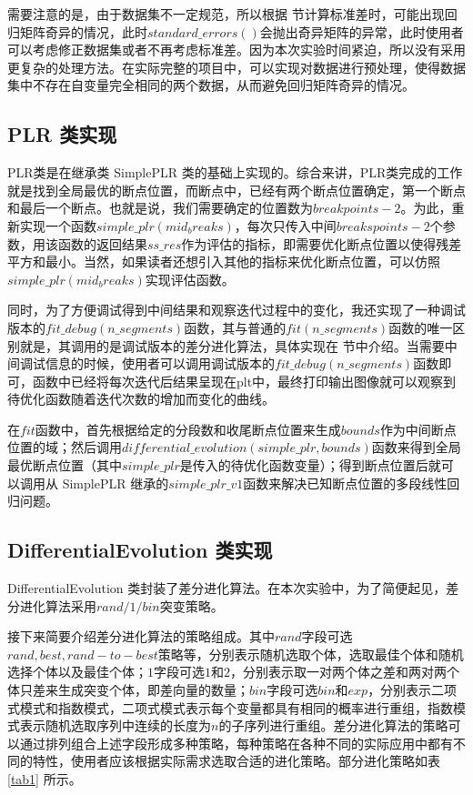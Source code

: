 需要注意的是，由于数据集不一定规范，所以根据  节计算标准差时，可能出现回归矩阵奇异的情况，此时$standard\_errors()$会抛出奇异矩阵的异常，此时使用者可以考虑修正数据集或者不再考虑标准差。因为本次实验时间紧迫，所以没有采用更复杂的处理方法。在实际完整的项目中，可以实现对数据进行预处理，使得数据集中不存在自变量完全相同的两个数据，从而避免回归矩阵奇异的情况。

\subsection{PLR 类实现}

PLR类是在继承类 SimplePLR 类的基础上实现的。综合来讲，PLR类完成的工作就是找到全局最优的断点位置，而断点中，已经有两个断点位置确定，第一个断点和最后一个断点。也就是说，我们需要确定的位置数为$breakpoints - 2$。为此，重新实现一个函数$simple\_plr(mid_breaks)$，每次只传入中间$breakspoints - 2$个参数，用该函数的返回结果$ss\_res$作为评估的指标，即需要优化断点位置以使得残差平方和最小。当然，如果读者还想引入其他的指标来优化断点位置，可以仿照$simple\_plr(mid_breaks)$实现评估函数。

同时，为了方便调试得到中间结果和观察迭代过程中的变化，我还实现了一种调试版本的$fit\_debug(n\_segments)$函数，其与普通的$fit(n\_segments)$函数的唯一区别就是，其调用的是调试版本的差分进化算法，具体实现在  节中介绍。当需要中间调试信息的时候，使用者可以调用调试版本的$fit\_debug(n\_segments)$函数即可，函数中已经将每次迭代后结果呈现在plt中，最终打印输出图像就可以观察到待优化函数随着迭代次数的增加而变化的曲线。

在$fit$函数中，首先根据给定的分段数和收尾断点位置来生成$bounds$作为中间断点位置的域；然后调用$differential\_evolution(simple\_plr, bounds)$函数来得到全局最优断点位置（其中$simple\_plr$是传入的待优化函数变量）；得到断点位置后就可以调用从 SimplePLR 继承的$simple\_plr\_v1$函数来解决已知断点位置的多段线性回归问题。

\subsection{DifferentialEvolution 类实现 \label{de}}

DifferentialEvolution 类封装了差分进化算法。在本次实验中，为了简便起见，差分进化算法采用$rand/1/bin$突变策略。

接下来简要介绍差分进化算法的策略组成。其中$rand$字段可选$rand,best,rand-to-best$策略等，分别表示随机选取个体，选取最佳个体和随机选择个体以及最佳个体；$1$字段可选$1$和$2$，分别表示取一对两个体之差和两对两个体只差来生成突变个体，即差向量的数量；$bin$字段可选$bin$和$exp$，分别表示二项式模式和指数模式，二项式模式表示每个变量都具有相同的概率进行重组，指数模式表示随机选取序列中连续的长度为$n$的子序列进行重组。差分进化算法的策略可以通过排列组合上述字段形成多种策略，每种策略在各种不同的实际应用中都有不同的特性，使用者应该根据实际需求选取合适的进化策略。部分进化策略如表 \ref{tab1} 所示。

